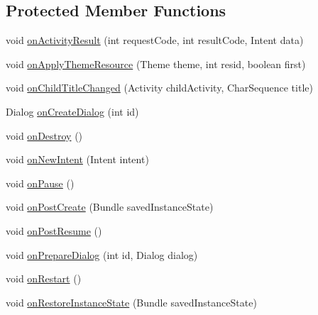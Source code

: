 \subsection*{Protected Member Functions}
\begin{DoxyCompactItemize}
\item 
void \hyperlink{classorg_1_1kde_1_1necessitas_1_1origo_1_1_qt_activity_a8b40da707524bfa95b2f7f6b69ada582}{on\-Activity\-Result} (int request\-Code, int result\-Code, Intent data)
\item 
void \hyperlink{classorg_1_1kde_1_1necessitas_1_1origo_1_1_qt_activity_accf74ca274971366688bac9ab793122e}{on\-Apply\-Theme\-Resource} (Theme theme, int resid, boolean first)
\item 
void \hyperlink{classorg_1_1kde_1_1necessitas_1_1origo_1_1_qt_activity_a09fbad28096bb7042ff514b576c62f1c}{on\-Child\-Title\-Changed} (Activity child\-Activity, Char\-Sequence title)
\item 
Dialog \hyperlink{classorg_1_1kde_1_1necessitas_1_1origo_1_1_qt_activity_a4594d7d857e15da0c5328e541846603c}{on\-Create\-Dialog} (int id)
\item 
void \hyperlink{classorg_1_1kde_1_1necessitas_1_1origo_1_1_qt_activity_a3afe4ca42dc4fc2b45a566d314468b0f}{on\-Destroy} ()
\item 
void \hyperlink{classorg_1_1kde_1_1necessitas_1_1origo_1_1_qt_activity_ab9fdd1e697db37a44dd6cab07913af72}{on\-New\-Intent} (Intent intent)
\item 
void \hyperlink{classorg_1_1kde_1_1necessitas_1_1origo_1_1_qt_activity_ac8a77432e996e4ad24d9ad97222109d0}{on\-Pause} ()
\item 
void \hyperlink{classorg_1_1kde_1_1necessitas_1_1origo_1_1_qt_activity_aa8ac966715659b355d38e7723c09e2dd}{on\-Post\-Create} (Bundle saved\-Instance\-State)
\item 
void \hyperlink{classorg_1_1kde_1_1necessitas_1_1origo_1_1_qt_activity_acbc631d75fc430c2a282b0cbed47ada9}{on\-Post\-Resume} ()
\item 
void \hyperlink{classorg_1_1kde_1_1necessitas_1_1origo_1_1_qt_activity_affd694682a617453952cdd8783e8ceea}{on\-Prepare\-Dialog} (int id, Dialog dialog)
\item 
void \hyperlink{classorg_1_1kde_1_1necessitas_1_1origo_1_1_qt_activity_ab5b2f523b153e87fbb977e5006f4ee2b}{on\-Restart} ()
\item 
void \hyperlink{classorg_1_1kde_1_1necessitas_1_1origo_1_1_qt_activity_a46b8081c24c564e891162a6c853f26c8}{on\-Restore\-Instance\-State} (Bundle saved\-Instance\-State)

\end{DoxyCompactItemize}

